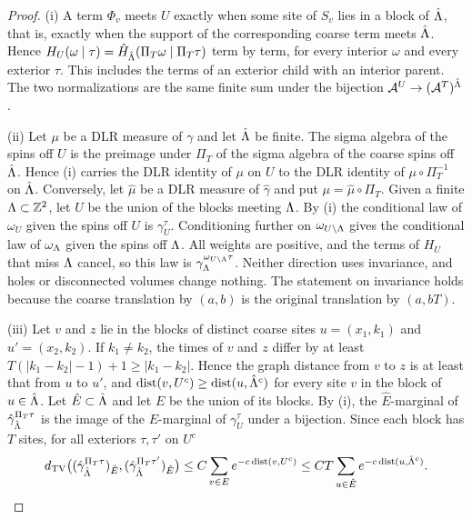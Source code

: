 \begin{proof}
(i) A term \(\Phi_v\) meets \(U\) exactly when some site of \(S_v\) lies in a block of \(\hat{\Lambda}\), that is, exactly when the support of the corresponding coarse term meets \(\hat{\Lambda}\). Hence \(H_U(\omega\mid\tau)=\hat H_{\hat{\Lambda}}(\Pi_T\omega\mid\Pi_T\tau)\) term by term, for every interior \(\omega\) and every exterior \(\tau\). This includes the terms of an exterior child with an interior parent. The two normalizations are the same finite sum under the bijection \(\mathcal A^U\to(\mathcal A^T)^{\hat{\Lambda}}\).

(ii) Let \(\mu\) be a DLR measure of \(\gamma\) and let \(\hat{\Lambda}\) be finite. The sigma algebra of the spins off \(U\) is the preimage under \(\Pi_T\) of the sigma algebra of the coarse spins off \(\hat{\Lambda}\). Hence (i) carries the DLR identity of \(\mu\) on \(U\) to the DLR identity of \(\mu\circ\Pi_T^{-1}\) on \(\hat{\Lambda}\). Conversely, let \(\hat\mu\) be a DLR measure of \(\hat\gamma\) and put \(\mu=\hat\mu\circ\Pi_T\). Given a finite \(\Lambda\subset\mathbb Z^2\), let \(U\) be the union of the blocks meeting \(\Lambda\). By (i) the conditional law of \(\omega_U\) given the spins off \(U\) is \(\gamma^\tau_U\). Conditioning further on \(\omega_{U\setminus\Lambda}\) gives the conditional law of \(\omega_\Lambda\) given the spins off \(\Lambda\). All weights are positive, and the terms of \(H_U\) that miss \(\Lambda\) cancel, so this law is \(\gamma^{\omega_{U\setminus\Lambda}\tau}_\Lambda\). Neither direction uses invariance, and holes or disconnected volumes change nothing. The statement on invariance holds because the coarse translation by \((a,b)\) is the original translation by \((a,bT)\).

(iii) Let \(v\) and \(z\) lie in the blocks of distinct coarse sites \(u=(x_1,k_1)\) and \(u'=(x_2,k_2)\). If \(k_1\ne k_2\), the times of \(v\) and \(z\) differ by at least \(T(|k_1-k_2|-1)+1\ge|k_1-k_2|\). Hence the graph distance from \(v\) to \(z\) is at least that from \(u\) to \(u'\), and \(\operatorname{dist}(v,U^c)\ge\operatorname{dist}(u,\hat{\Lambda}^c)\) for every site \(v\) in the block of \(u\in\hat{\Lambda}\). Let \(\hat E\subset\hat{\Lambda}\) and let \(E\) be the union of its blocks. By (i), the \(\hat E\)-marginal of \(\hat\gamma^{\Pi_T\tau}_{\hat{\Lambda}}\) is the image of the \(E\)-marginal of \(\gamma^\tau_U\) under a bijection. Since each block has \(T\) sites, for all exteriors \(\tau,\tau'\) on \(U^c\)
\[
d_{\mathrm{TV}}\bigl((\hat\gamma^{\Pi_T\tau}_{\hat{\Lambda}})_{\hat E},(\hat\gamma^{\Pi_T\tau'}_{\hat{\Lambda}})_{\hat E}\bigr)
\le C\sum_{v\in E}e^{-c\operatorname{dist}(v,U^c)}
\le CT\sum_{u\in\hat E}e^{-c\operatorname{dist}(u,\hat{\Lambda}^c)}.
\]
\end{proof}

